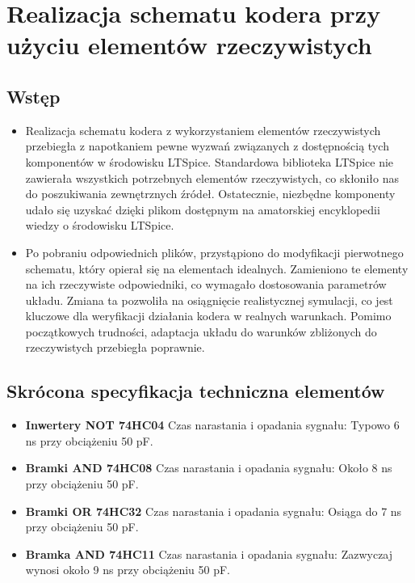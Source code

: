 \documentclass{article}
\begin{document}

\newpage
\section{Realizacja schematu kodera przy użyciu elementów rzeczywistych}
\subsection{Wstęp}
\begin{itemize}
    \item 
    Realizacja schematu kodera z wykorzystaniem elementów rzeczywistych przebiegła z napotkaniem pewne wyzwań związanych z dostępnością tych komponentów w środowisku LTSpice. Standardowa biblioteka LTSpice nie zawierała wszystkich potrzebnych elementów rzeczywistych, co skłoniło nas do poszukiwania zewnętrznych źródeł. Ostatecznie, niezbędne komponenty udało się uzyskać dzięki plikom dostępnym na amatorskiej encyklopedii wiedzy o środowisku LTSpice. \cite{ltwiki} \cite{borod}
    \item 
    Po pobraniu odpowiednich plików, przystąpiono do modyfikacji pierwotnego schematu, który opierał się na elementach idealnych. Zamieniono te elementy na ich rzeczywiste odpowiedniki, co wymagało dostosowania parametrów układu. Zmiana ta pozwoliła na osiągnięcie realistycznej symulacji, co jest kluczowe dla weryfikacji działania kodera w realnych warunkach. Pomimo początkowych trudności, adaptacja układu do warunków zbliżonych do rzeczywistych przebiegła poprawnie. \cite{actel}
    
\end{itemize}

\subsection{Skrócona specyfikacja techniczna elementów}
\begin{itemize}
    \item \textbf{Inwertery NOT 74HC04}\newline 
    Czas narastania i opadania sygnału: Typowo 6 ns przy obciążeniu 50 pF. \cite{hc04}
    
    \item \textbf{Bramki AND 74HC08}\newline 
    Czas narastania i opadania sygnału: Około 8 ns przy obciążeniu 50 pF. \cite{hc08}

    \item \textbf{Bramki OR 74HC32}\newline 
    Czas narastania i opadania sygnału: Osiąga do 7 ns przy obciążeniu 50 pF. \cite{hc32}

    \item \textbf{Bramka AND 74HC11}\newline 
    Czas narastania i opadania sygnału: Zazwyczaj wynosi około 9 ns przy obciążeniu 50 pF. \cite{hc11}

\end{itemize}
\end{document}
